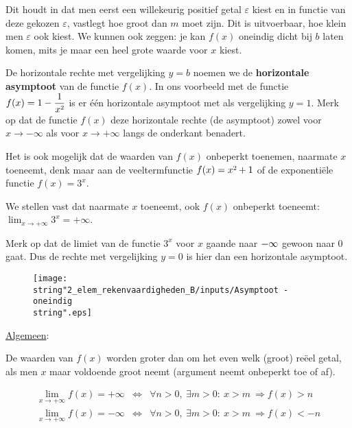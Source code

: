 Dit houdt in dat men eerst een willekeurig positief getal $\varepsilon$
kiest en in functie van deze gekozen $\varepsilon$, vastlegt hoe
groot dan $m$ moet zijn. Dit is uitvoerbaar, hoe klein men $\varepsilon$
ook kiest. We kunnen ook zeggen: je kan $f(x)$ oneindig dicht bij
$b$ laten komen, mits je maar een heel grote waarde voor $x$ kiest.

\medskip{}


De horizontale rechte met vergelijking $y=b$ noemen we de \textbf{horizontale
asymptoot} van de functie $f(x)$. In ons voorbeeld met de functie
$f(x)={\displaystyle 1-\frac{1}{x\text{\texttwosuperior}}}$ is er
\'e\'en horizontale asymptoot met als vergelijking $y=1$. Merk op dat
de functie $f(x)$ deze horizontale rechte (de asymptoot) zowel voor
$x\rightarrow-\infty$ als voor $x\rightarrow+\infty$ langs de onderkant
benadert.

\bigskip{}


\noindent Het is ook mogelijk dat de waarden van $f(x)$ onbeperkt
toenemen, naarmate $x$ toeneemt, denk maar aan de veeltermfunctie
$f(x)=x\text{\texttwosuperior}+1$ of de exponenti\"ele functie $f(x)=3^{x}$.

\noindent We stellen vast dat naarmate $x$ toeneemt, ook $f(x)$
onbeperkt toeneemt: ${\displaystyle \lim_{x\to+\infty}}3^{x}=+\infty$. 

\noindent Merk op dat de limiet van de functie $3^{x}$ voor $x$
gaande naar $\text{\textminus\ensuremath{\infty}}$ gewoon naar $0$
gaat. Dus de rechte met vergelijking $y=0$ is hier dan een horizontale
asymptoot.

\begin{figure}[h]
\centering{}\texttt{[image: \\string"2\_elem\_rekenvaardigheden\_B/inputs/Asymptoot - oneindig\\string".eps]} 
\end{figure}

\noindent \uline{Algemeen}:

De waarden van $f(x)$ worden groter dan om het even welk (groot)
re\"eel getal, als men $x$ maar voldoende groot neemt (argument neemt
onbeperkt toe of af).

\medskip{}


\begin{eqnarray*}
{\displaystyle \lim_{x\to+\infty}}f(x)=+\infty & \Leftrightarrow & \forall n>0,\:\exists m>0:\:x>m\:\Rightarrow f(x)>n\\
{\displaystyle \lim_{x\to+\infty}}f(x)=-\infty & \Leftrightarrow & \forall n>0,\:\exists m>0:\:x>m\:\Rightarrow f(x)<-n\\
\end{eqnarray*} 

